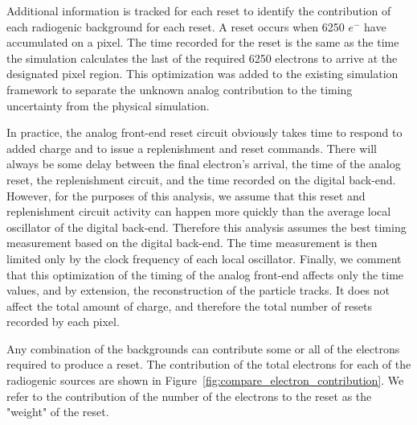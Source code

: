 Additional information is tracked for each reset to identify the contribution of each radiogenic background for each reset.
A reset occurs when 6250 $e^{-}$ have accumulated on a pixel.
The time recorded for the reset is the same as the time the simulation calculates the last of the required 6250 electrons to arrive at the designated pixel region.
This optimization was added to the existing simulation framework to separate the unknown analog contribution to the timing uncertainty from the physical simulation.

In practice, the analog front-end reset circuit obviously takes time to respond to added charge and to issue a replenishment and reset commands.
There will always be some delay between the final electron's arrival, the time of the analog reset, the replenishment circuit, and the time recorded on the digital back-end.
However, for the purposes of this analysis, we assume that this reset and replenishment circuit activity can happen more quickly than the average local oscillator of the digital back-end. 
Therefore this analysis assumes the best timing measurement based on the digital back-end.
The time measurement is then limited only by the clock frequency of each local oscillator.
Finally, we comment that this optimization of the timing of the analog front-end affects only the time values, and by extension, the reconstruction of the particle tracks.
It does not affect the total amount of charge, and therefore the total number of resets recorded by each pixel.

Any combination of the backgrounds can contribute some or all of the electrons required to produce a reset.
The contribution of the total electrons for each of the radiogenic sources are shown in Figure~\ref{fig:compare_electron_contribution}.
We refer to the contribution of the number of the electrons to the reset as the "weight" of the reset.


